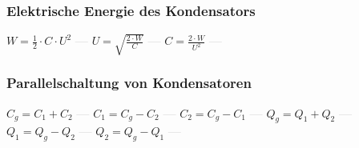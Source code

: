 \subsubsection{Elektrische Energie des Kondensators} 
\begin{minipage}{0.45\textwidth} 
\end{minipage} 
\begin{minipage}{0.45\textwidth} 
 
\end{minipage} 
$ W =\frac{1}{2}\cdot C\cdot U^{2} $ \textcolor{lightgray}{\textbf{---}} 
$ U = \sqrt{\frac{2\cdot W}{ C}} $ \textcolor{lightgray}{\textbf{---}} 
$ C = \frac{2\cdot W}{ U^{2} } $ \textcolor{lightgray}{\textbf{---}} 

\subsubsection{Parallelschaltung von Kondensatoren} 
\begin{minipage}{0.45\textwidth} 
\end{minipage} 
\begin{minipage}{0.45\textwidth} 
 
\end{minipage} 
$ C_{g}  = C_{1}  + C_{2} $ \textcolor{lightgray}{\textbf{---}} 
$ C_{1}  = C_{g}  - C_{2} $ \textcolor{lightgray}{\textbf{---}} 
$ C_{2}  = C_{g}  - C_{1} $ \textcolor{lightgray}{\textbf{---}} 
$ Q_{g}  = Q_{1}  + Q_{2} $ \textcolor{lightgray}{\textbf{---}} 
$ Q_{1}  = Q_{g}  - Q_{2} $ \textcolor{lightgray}{\textbf{---}} 
$ Q_{2}  = Q_{g}  - Q_{1} $ \textcolor{lightgray}{\textbf{---}} 


